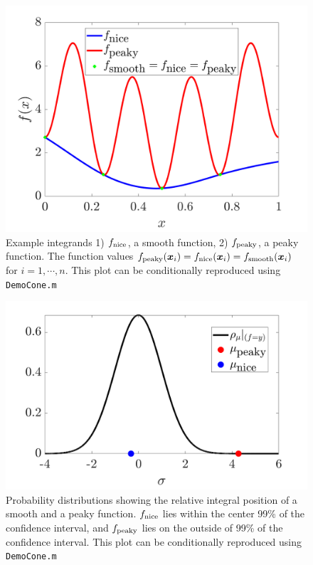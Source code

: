 \documentclass{svjour3}                     %
\newcommand{\bm}[1]{\boldsymbol{#1}}
\newcommand{\vx}{\bm{x}}
\newcommand{\NICE}{\textup{nice}}
\newcommand{\PEAKY}{\textup{peaky}}
\newcommand{\TRUE}{\textup{smooth}}
\newcommand{\code}[1]{\texttt{#1}}
\newcommand{\JRNote}[1]{{\textcolor{green}{JR: #1}}}
\begin{document}
\begin{figure}[ht]
	\centering
	\includegraphics[width=0.8\linewidth]{figures/cone_bayes_f_real}
	\caption{Example integrands 1) $f_{\NICE}$, a smooth function, 2) $f_{\PEAKY}$, a peaky function. The function values $f_{\PEAKY}(\vx_i) = f_{\NICE}(\vx_i) = f_{\TRUE}(\vx_i) $ for $i=1, \cdots, n$. This plot can be conditionally reproduced using \code{DemoCone.m}}
	\label{fig:cone_bayes_functions}
\end{figure}
\begin{figure}[ht]
	\centering
	\includegraphics[width=0.8\linewidth]{figures/cone_bayes_mu_pdf}
	\caption{Probability distributions showing the relative integral position of a smooth and a peaky function. $f_{\NICE}$ lies within the center 99\% of the confidence interval, and $f_{\PEAKY}$ lies on the outside of 99\% of  the confidence interval. This plot can be conditionally reproduced using \code{DemoCone.m}}
	\label{fig:cone_bayes_posterior}
\end{figure}
\end{document}
